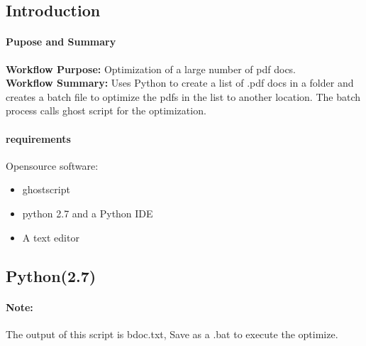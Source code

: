 \documentclass[class=article , crop=false, titlepage, twoside, multi={itemize, figure, verbatim}, float=false]{standalone}
\title{}  %
\begin{document}

\ifstandalone
\maketitle %
\clearpage
\tableofcontents %
\clearpage
\fi

\clearpage

\subsection{Introduction}
\paragraph{Pupose and Summary}
\textbf{Workflow Purpose:} Optimization of a large number of pdf docs.\\
\textbf{Workflow Summary:} Uses Python to create a list of .pdf docs in a folder and creates a batch file to optimize the pdfs in the list to another location.  The batch process calls ghost script for the optimization.

\paragraph{requirements}
Opensource software:
\begin{itemize}
\item ghostscript 
\item python 2.7 and a Python IDE 
\item A text editor
\end{itemize}
\subsection{Python(2.7)}

\paragraph{Note:} The output of this script is bdoc.txt, Save as a .bat to execute the optimize.
\end{document}
